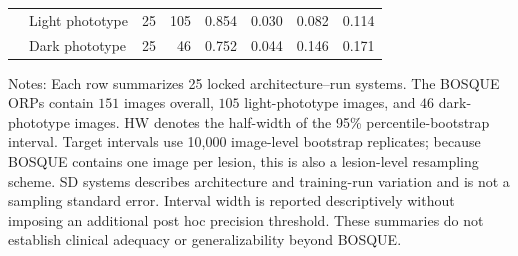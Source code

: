 \begin{table}[h!]
\begin{tabular}{llrrrrrr}
 & Light phototype & 25 & 105 & 0.854 & 0.030 & 0.082 & 0.114 \\
 & Dark phototype & 25 & 46 & 0.752 & 0.044 & 0.146 & 0.171 \\
\bottomrule
\end{tabular}
\begin{flushleft}
\footnotesize Notes: Each row summarizes 25 locked architecture--run systems. The BOSQUE ORPs contain $151$ images overall, $105$ light-phototype images, and $46$ dark-phototype images. HW denotes the half-width of the 95\% percentile-bootstrap interval. Target intervals use 10{,}000 image-level bootstrap replicates; because BOSQUE contains one image per lesion, this is also a lesion-level resampling scheme. SD systems describes architecture and training-run variation and is not a sampling standard error. Interval width is reported descriptively without imposing an additional post hoc precision threshold. These summaries do not establish clinical adequacy or generalizability beyond BOSQUE.
\end{flushleft}
\end{table}
